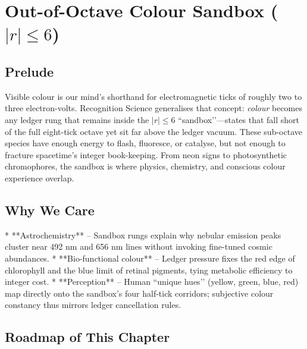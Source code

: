 \documentclass[11pt,oneside]{book}
\begin{document}
{\chapter{Out-of-Octave Colour Sandbox (\boldmath$|r|\le 6$)}
\label{chap:colour-sandbox}

\section*{Prelude}

Visible colour is our mind’s shorthand for electromagnetic ticks of
roughly two to three electron-volts.  
Recognition Science generalises that concept: \emph{colour} becomes any
ledger rung that remains inside the \(|r|\!\le\!6\) “sandbox’’—states
that fall short of the full eight-tick octave yet sit far above the
ledger vacuum.  
These sub-octave species have enough energy to flash, fluoresce, or
catalyse, but not enough to fracture spacetime’s integer book-keeping.
From neon signs to photosynthetic chromophores, the sandbox is where
physics, chemistry, and conscious colour experience overlap.

\section*{Why We Care}

* **Astrochemistry** – Sandbox rungs explain why nebular emission peaks
  cluster near 492 nm and 656 nm lines without invoking fine-tuned
  cosmic abundances.  
* **Bio-functional colour** – Ledger pressure fixes the red edge of
  chlorophyll and the blue limit of retinal pigments, tying metabolic
  efficiency to integer cost.  
* **Perception** – Human “unique hues’’ (yellow, green, blue, red) map
  directly onto the sandbox’s four half-tick corridors; subjective
  colour constancy thus mirrors ledger cancellation rules.

\section*{Roadmap of This Chapter}

}
\end{document}
